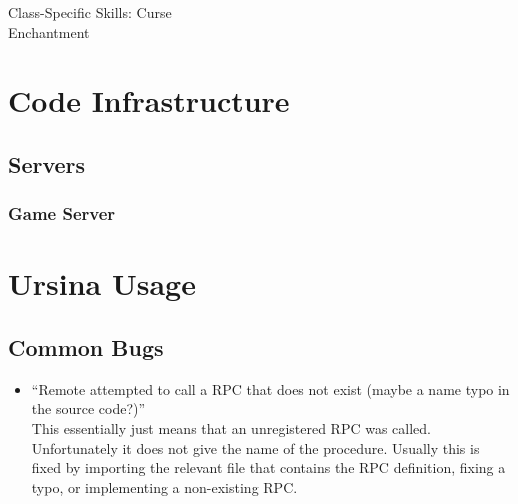 \documentclass{article}
\begin{document}
Class-Specific Skills:
Curse\\
Enchantment\\


\section{Code Infrastructure}
\subsection{Servers}
\subsubsection{Game Server}

\section{Ursina Usage}
\subsection{Common Bugs}
\begin{itemize}
    \item ``Remote attempted to call a RPC that does not exist (maybe a name typo in the source code?)''\\
        This essentially just means that an unregistered RPC was called. Unfortunately it does not give
        the name of the procedure. Usually this is fixed by importing the relevant file that contains the
        RPC definition, fixing a typo, or implementing a non-existing RPC.
\end{itemize}
\end{document}
